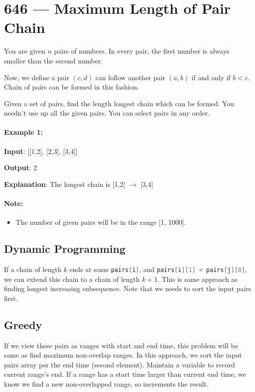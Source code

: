 \section{646 --- Maximum Length of Pair Chain}
You are given $n$ pairs of numbers. In every pair, the first number is always smaller than the second number.

Now, we define a pair $(c, d)$ can follow another pair $(a, b)$ if and only if $b < c$. Chain of pairs can be formed in this fashion.

Given a set of pairs, find the length longest chain which can be formed. You needn't use up all the given pairs. You can select pairs in any order.

\paragraph{Example 1:}

\begin{flushleft}
\textbf{Input}: [[1,2], [2,3], [3,4]]

\textbf{Output}: 2

\textbf{Explanation}: The longest chain is [1,2] $\longrightarrow$ [3,4]

\end{flushleft}

\paragraph{Note:}

\begin{itemize}
\item The number of given pairs will be in the range [1, 1000].
\end{itemize}

\subsection{Dynamic Programming}
If a chain of length $k$ ends at some \lstinline[language=C++, basicstyle=\small\ttfamily, keywordstyle=\bfseries\color{green!40!black}]|pairs[i]|, and \lstinline[language=C++, basicstyle=\small\ttfamily, keywordstyle=\bfseries\color{green!40!black}]|pairs[i][1] < pairs[j][0]|, we can extend this chain to a chain of length $k+1$. This is same approach as finding longest increasing subsequence. Note that we needs to sort the input pairs first.

\subsection{Greedy}
If we view these pairs as ranges with start and end time, this problem will be same as find maximum non-overlap ranges. In this approach, we sort the input pairs array per the end time (second element). Maintain a variable to record current range's end. If a range has a start time larger than current end time, we know we find a new  non-overlapped range, so increments the result.



